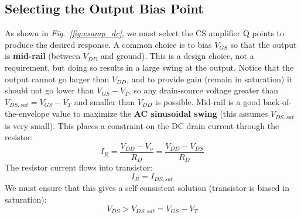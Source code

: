 \subsection{Selecting the Output Bias Point}
As shown in \emph{Fig.~\ref{fig:csamp_dc}}, we must select the CS amplifier Q points to produce the desired response.  A common choice is to bias $V_{GS}$ so that the output is \textbf{mid-rail} (between $V_{DD}$ and ground).  This is a design choice, not a requirement, but doing so results in a large swing at the output.  Notice that the output cannot go larger than $V_{DD}$, and to provide gain (remain in saturation) it should not go lower than $V_{GS}-V_T$, so any drain-source voltage greater than $V_{DS,sat} = V_{GS}-V_T$ and smaller than $V_{DD}$ is possible.  Mid-rail is a good back-of-the-envelope value to maximize the \textbf{AC sinusoidal swing} (this assumes $V_{DS,sat}$ is very small).  This places a constraint on the DC drain current through the resistor:
    \begin{equation}
        I_R = \frac{V_{DD} - V_o}{R_D} = \frac{V_{DD} - V_{DS}}{R_D}
    \end{equation}
The resistor current flows into transistor:
    \begin{equation}
        I_R = I_{DS,sat}
    \end{equation}
We must ensure that this gives a self-consistent solution (transistor is biased in saturation):
    \begin{equation}
        V_{DS} > V_{DS,sat} = V_{GS} - V_T
    \end{equation}
\newpage
